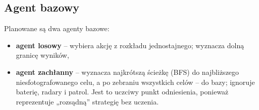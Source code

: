 \subsection{Agent bazowy}
\label{sec:baseline}

Planowane są dwa agenty bazowe:
\begin{itemize}
  \item \textbf{agent losowy} -- wybiera akcję z rozkładu jednostajnego;
        wyznacza dolną granicę wyników,
  \item \textbf{agent zachłanny} -- wyznacza najkrótszą ścieżkę (BFS) do
        najbliższego niesfotografowanego celu, a po zebraniu wszystkich celów
        -- do bazy; ignoruje baterię, radary i patrol. Jest to uczciwy
        punkt odniesienia, ponieważ reprezentuje „rozsądną'' strategię
        bez uczenia.
\end{itemize}

